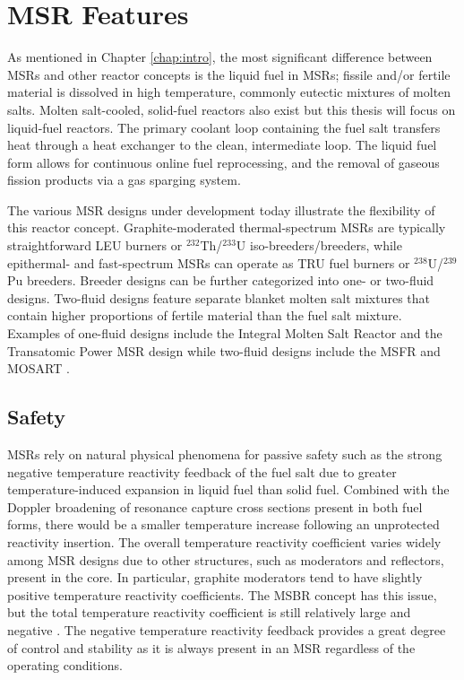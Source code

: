 \section{\gls{MSR} Features}

As mentioned in Chapter \ref{chap:intro}, the most significant difference
between \glspl{MSR} and other reactor concepts is the liquid fuel in
\glspl{MSR}; fissile and/or fertile material is dissolved in high temperature,
commonly eutectic mixtures of molten salts. Molten salt-cooled, solid-fuel
reactors also exist but this thesis will focus on liquid-fuel reactors.
The primary coolant loop containing the fuel salt
transfers heat through a heat exchanger to the clean, intermediate
loop. The liquid fuel form allows for continuous online fuel reprocessing,
and the removal of gaseous fission products via a gas sparging system.

The various \gls{MSR} designs under development today illustrate the
flexibility of this reactor concept. Graphite-moderated thermal-spectrum
\glspl{MSR} are typically straightforward \gls{LEU} burners or
$^{232}$Th/$^{233}$U iso-breeders/breeders, while epithermal- and
fast-spectrum \glspl{MSR} can operate as \gls{TRU} fuel burners or
$^{238}$U/$^{239}$Pu breeders. Breeder designs can be further categorized into
one- or two-fluid designs. Two-fluid designs feature separate blanket molten
salt mixtures that contain higher proportions of fertile material than the
fuel salt mixture. Examples of one-fluid designs include the Integral Molten
Salt Reactor \cite{leblanc_integral_2015} and the Transatomic Power
\gls{MSR} design \cite{transatomic_power_corporation_technical_2016} while
two-fluid designs include the \gls{MSFR} \cite{merle_optimized_2007} and
\gls{MOSART} \cite{ignatiev_molten_2014}.

\subsection{Safety}

\glspl{MSR} rely on natural physical phenomena for passive safety such as the
strong negative temperature reactivity feedback of the fuel salt due to
greater temperature-induced expansion in liquid fuel than solid
fuel. Combined with the Doppler broadening of resonance capture cross sections
present in both fuel forms, there would be a smaller temperature
increase following an unprotected reactivity insertion. The overall
temperature reactivity coefficient varies widely among \gls{MSR}
designs due to other structures, such as moderators and reflectors, present in
the core. In particular, graphite moderators tend to have slightly positive
temperature reactivity coefficients. The \gls{MSBR} concept has this issue,
but the total temperature reactivity coefficient is still relatively large and
negative \cite{rykhlevskii_modeling_2019}. The negative temperature reactivity
feedback provides a great degree of control and stability as it is always
present in an \gls{MSR} regardless of the operating conditions.

